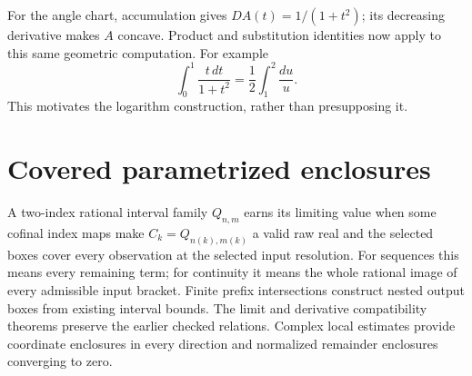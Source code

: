 For the angle chart, accumulation gives
$DA(t)=1/(1+t^2)$; its decreasing derivative makes $A$ concave.  Product
and substitution identities now apply to this same geometric computation.
For example
\[
 \int_0^1\frac{t\,dt}{1+t^2}
       =\frac12\int_1^2\frac{du}{u}.
\]
This motivates the logarithm construction, rather than presupposing it.

\section{Covered parametrized enclosures}
A two-index rational interval family $Q_{n,m}$ earns its limiting value when
some cofinal index maps make $C_k=Q_{n(k),m(k)}$ a valid raw real and the
selected boxes cover every observation at the selected input resolution.
For sequences this means every remaining term; for continuity it means the
whole rational image of every admissible input bracket. Finite prefix
intersections construct nested output boxes from existing interval bounds.
The limit and derivative compatibility theorems preserve the earlier checked
relations. Complex local estimates provide coordinate enclosures in every
direction and normalized remainder enclosures converging to zero.
